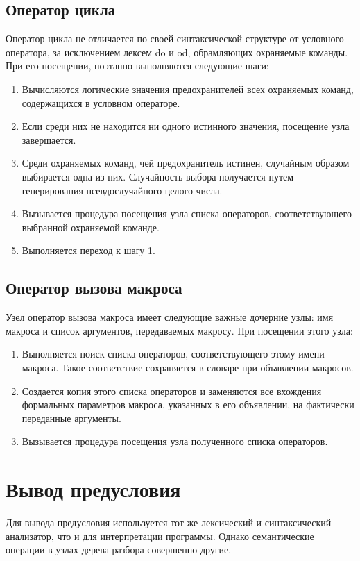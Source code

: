\subsection{Оператор цикла}
Оператор цикла не отличается по своей синтаксической структуре от условного оператора, за 
исключением лексем do и od, обрамляющих охраняемые команды. При его посещении, поэтапно выполняются
следующие шаги:
\begin{enumerate}
    \item Вычисляются логические значения предохранителей всех охраняемых команд, содержащихся в условном операторе.
    \item Если среди них не находится ни одного истинного значения, посещение узла завершается. 
    \item Среди охраняемых команд, чей предохранитель истинен, случайным образом выбирается одна из них. Случайность
    выбора получается путем генерирования псевдослучайного целого числа. 
    \item Вызывается процедура посещения узла списка операторов, соответствующего выбранной охраняемой команде.
    \item Выполняется переход к шагу 1.
\end{enumerate}

\subsection{Оператор вызова макроса}
Узел оператор вызова макроса имеет следующие важные дочерние узлы: имя макроса и список аргументов, передаваемых макросу.
При посещении этого узла:
\begin{enumerate}
    \item Выполняется поиск списка операторов, соответствующего этому имени макроса. Такое соответствие сохраняется в словаре
    при объявлении макросов.
    \item Создается копия этого списка операторов и заменяются все вхождения формальных параметров макроса,
    указанных в его объявлении, на фактически переданные аргументы.
    \item Вызывается процедура посещения узла полученного списка операторов.
\end{enumerate}


\section{Вывод предусловия}
Для вывода предусловия используется тот же лексический и синтаксический анализатор,
что и для интерпретации программы. Однако семантические операции в узлах дерева разбора совершенно другие.

